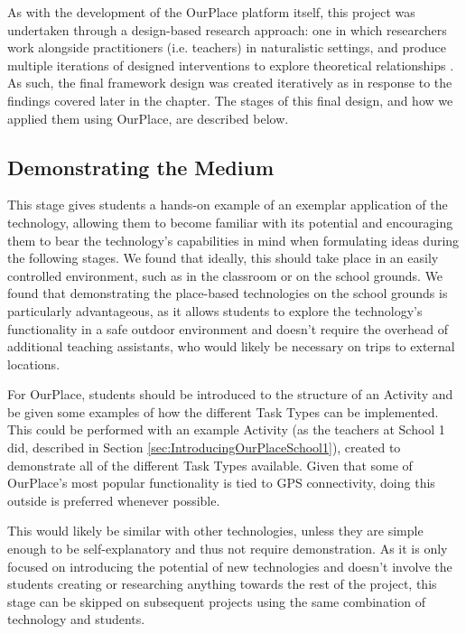 As with the development of the OurPlace platform itself, this project was undertaken through a design-based research approach: one in which researchers work alongside practitioners (i.e. teachers) in naturalistic settings, and produce multiple iterations of designed interventions to explore theoretical relationships \citep{Barab2004}. As such, the final framework design was created iteratively as in response to the findings covered later in the chapter. The stages of this final design, and how we applied them using OurPlace, are described below.

\subsection{Demonstrating the Medium}
This stage gives students a hands-on example of an exemplar application of the technology, allowing them to become familiar with its potential and encouraging them to bear the technology's capabilities in mind when formulating ideas during the following stages. We found that ideally, this should take place in an easily controlled environment, such as in the classroom or on the school grounds. We found that demonstrating the place-based technologies on the school grounds is particularly advantageous, as it allows students to explore the technology's functionality in a safe outdoor environment and doesn't require the overhead of additional teaching assistants, who would likely be necessary on trips to external locations. 

For OurPlace, students should be introduced to the structure of an Activity and be given some examples of how the different Task Types can be implemented. This could be performed with an example Activity (as the teachers at School 1 did, described in Section \ref{sec:IntroducingOurPlaceSchool1}), created to demonstrate all of the different Task Types available. Given that some of OurPlace's most popular functionality is tied to GPS connectivity, doing this outside is preferred whenever possible. 

This would likely be similar with other technologies, unless they are simple enough to be self-explanatory and thus not require demonstration. As it is only focused on introducing the potential of new technologies and doesn't involve the students creating or researching anything towards the rest of the project, this stage can be skipped on subsequent projects using the same combination of technology and students.

